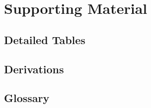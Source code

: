 \chapter{Supporting Material}
\label{app:supporting}


\section{Detailed Tables}
\label{app:supporting:tables}


\section{Derivations}
\label{app:supporting:derivations}


\section{Glossary}
\label{app:supporting:glossary}

